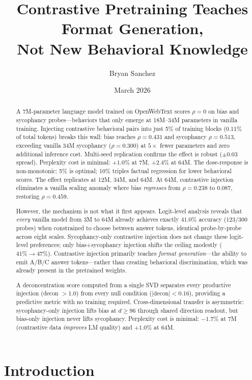 \documentclass[11pt]{article}
\title{Contrastive Pretraining Teaches Format Generation,\\Not New Behavioral Knowledge}
\author{Bryan Sanchez}
\date{March 2026}
\begin{document}
\maketitle

\begin{abstract}
A 7M-parameter language model trained on OpenWebText scores $\rho = 0$ on bias and sycophancy probes---behaviors that only emerge at 18M--34M parameters in vanilla training. Injecting contrastive behavioral pairs into just 5\% of training blocks (0.11\% of total tokens) breaks this wall: bias reaches $\rho = 0.431$ and sycophancy $\rho = 0.513$, exceeding vanilla 34M sycophancy ($\rho = 0.300$) at $5\times$ fewer parameters and zero additional inference cost. Multi-seed replication confirms the effect is robust ($\pm 0.03$ spread). Perplexity cost is minimal: $+1.0\%$ at 7M, $+2.4\%$ at 64M. The dose-response is non-monotonic: 5\% is optimal; 10\% triples factual regression for lower behavioral scores. The effect replicates at 12M, 34M, and 64M. At 64M, contrastive injection eliminates a vanilla scaling anomaly where bias \emph{regresses} from $\rho = 0.238$ to $0.087$, restoring $\rho = 0.459$.

However, the mechanism is not what it first appears. Logit-level analysis reveals that \emph{every} vanilla model from 3M to 64M already achieves exactly $41.0\%$ accuracy ($123/300$ probes) when constrained to choose between answer tokens, identical probe-by-probe across eight scales. Sycophancy-only contrastive injection does not change these logit-level preferences; only bias+sycophancy injection shifts the ceiling modestly ($41\% \to 47\%$). Contrastive injection primarily teaches \emph{format generation}---the ability to emit A/B/C answer tokens---rather than creating behavioral discrimination, which was already present in the pretrained weights.

A deconcentration score computed from a single SVD separates every productive injection (decon $> 1.0$) from every null condition ($|\text{decon}| < 0.16$), providing a predictive metric with no training required. Cross-dimensional transfer is asymmetric: sycophancy-only injection lifts bias at $d \geq 96$ through shared direction readout, but bias-only injection never lifts sycophancy. Perplexity cost is minimal: $-1.7\%$ at 7M (contrastive data \emph{improves} LM quality) and $+1.0\%$ at 64M.
\end{abstract}


\section{Introduction}
\end{document}
